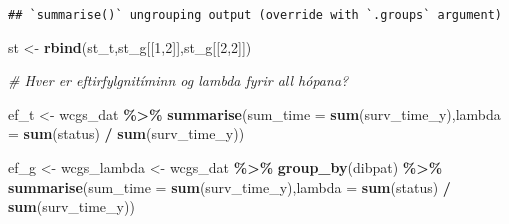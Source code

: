 \documentclass[
]{book}
\newenvironment{Shaded}{\begin{snugshade}}{\end{snugshade}}
\newcommand{\CommentTok}[1]{\textcolor[rgb]{0.56,0.35,0.01}{\textit{#1}}}
\newcommand{\DataTypeTok}[1]{\textcolor[rgb]{0.13,0.29,0.53}{#1}}
\newcommand{\DecValTok}[1]{\textcolor[rgb]{0.00,0.00,0.81}{#1}}
\newcommand{\KeywordTok}[1]{\textcolor[rgb]{0.13,0.29,0.53}{\textbf{#1}}}
\newcommand{\NormalTok}[1]{#1}
\newcommand{\OperatorTok}[1]{\textcolor[rgb]{0.81,0.36,0.00}{\textbf{#1}}}
\newcommand{\StringTok}[1]{\textcolor[rgb]{0.31,0.60,0.02}{#1}}
\begin{document}
\begin{Shaded}
\end{Shaded}

\begin{verbatim}
## `summarise()` ungrouping output (override with `.groups` argument)
\end{verbatim}

\begin{Shaded}
\begin{Highlighting}[]
\NormalTok{st <{-}}\StringTok{ }\KeywordTok{rbind}\NormalTok{(st\_t,st\_g[[}\DecValTok{1}\NormalTok{,}\DecValTok{2}\NormalTok{]],st\_g[[}\DecValTok{2}\NormalTok{,}\DecValTok{2}\NormalTok{]])}

\CommentTok{\# Hver er eftirfylgnitíminn og lambda fyrir all hópana?}

\NormalTok{ef\_t <{-}}\StringTok{ }\NormalTok{wcgs\_dat }\OperatorTok{\%>\%}\StringTok{ }
\StringTok{  }\KeywordTok{summarise}\NormalTok{(}\DataTypeTok{sum\_time =} \KeywordTok{sum}\NormalTok{(surv\_time\_y),}\DataTypeTok{lambda =} \KeywordTok{sum}\NormalTok{(status) }\OperatorTok{/}\StringTok{ }\KeywordTok{sum}\NormalTok{(surv\_time\_y))}

\NormalTok{ef\_g <{-}}\StringTok{ }\NormalTok{wcgs\_lambda <{-}}\StringTok{ }\NormalTok{wcgs\_dat }\OperatorTok{\%>\%}\StringTok{ }
\StringTok{  }\KeywordTok{group\_by}\NormalTok{(dibpat) }\OperatorTok{\%>\%}\StringTok{ }
\StringTok{  }\KeywordTok{summarise}\NormalTok{(}\DataTypeTok{sum\_time =} \KeywordTok{sum}\NormalTok{(surv\_time\_y),}\DataTypeTok{lambda =} \KeywordTok{sum}\NormalTok{(status) }\OperatorTok{/}\StringTok{ }\KeywordTok{sum}\NormalTok{(surv\_time\_y))}
\end{Highlighting}
\end{Shaded}
\end{document}

